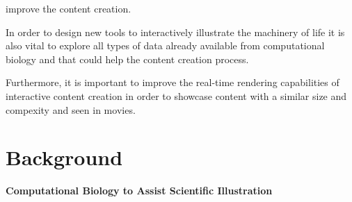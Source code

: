  improve the content creation.

In order to design new tools to interactively illustrate the machinery of life it is also vital to explore all types of data already available from computational biology and that could help the content creation process.

Furthermore, it is important to improve the real-time rendering capabilities of interactive content creation in order to showcase content with a similar size and compexity and seen in movies.



%
%






%
%


\section{Background}

\textbf{Computational Biology to Assist Scientific Illustration}

